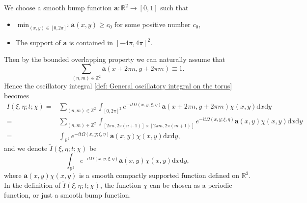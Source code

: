 \documentclass[12pt]{amsart}
\newcommand{\R}{\mathbb{R}}
\newcommand{\Z}{\mathbb{Z}}
\def\d{\mathrm{d}}
\begin{document}
We choose a smooth bump function $\mathbf{a}:\R^{2}\to\left[0,1\right]$ such that
\begin{itemize}
    \item $\min_{\left(x,y\right)\in\left[0,2\pi\right]^{2}}\mathbf{a}\left(x,y\right)\geq c_{0}$ for some positive number $c_{0}$,
    \item The support of $\mathbf{a}$ is contained in $\left[-4\pi,4\pi\right]^{2}$.
\end{itemize}
Then by the bounded overlapping property we can naturally assume that 
\begin{equation*}
    \sum_{\left(n,m\right)\in\Z^{2}}\mathbf{a}\left(x+2\pi n,y+2\pi m\right)\equiv 1.
\end{equation*}
Hence the oscillatory integral \eqref{def: General oscillatory integral on the torus} becomes
\begin{equation*}
    \begin{aligned}
        I\left(\xi,\eta;t;\chi\right)=&\sum_{\left(n,m\right)\in\Z^{2}}\int_{\left[0,2\pi\right]^{2}}e^{-it\Omega\left(x,y;\xi,\eta\right)}\mathbf{a}\left(x+2\pi n,y+2\pi m\right)\chi\left(x,y\right)\d x\d y\\
        =&\sum_{\left(n,m\right)\in\Z^{2}}\int_{\left[2\pi n,2\pi\left(n+1\right)\right]\times\left[2\pi m,2\pi\left(m+1\right)\right]}e^{-it\Omega\left(x,y;\xi,\eta\right)}\mathbf{a}\left(x,y\right)\chi\left(x,y\right)\d x\d y\\
        =&\int_{\R^{2}}e^{-it\Omega\left(x,y;\xi,\eta\right)}\mathbf{a}\left(x,y\right)\chi\left(x,y\right)\d x\d y,
    \end{aligned}
\end{equation*}
and we denote $\widetilde{I}\left(\xi,\eta;t;\chi\right)$ be
\begin{equation}\label{def: general oscillatory integral on the plane}
    \int_{\R^{2}}e^{-it\Omega\left(x,y;\xi,\eta\right)}\mathbf{a}\left(x,y\right)\chi\left(x,y\right)\d x\d y,
\end{equation}
where $\mathbf{a}(x,y)\chi(x,y)$ is a smooth compactly supported function defined on $\R^{2}$. In the definition of $\widetilde{I}\left(\xi,\eta;t;\chi\right)$, the function $\chi$ can be chosen as a periodic function, or just a smooth bump function.
\end{document}
